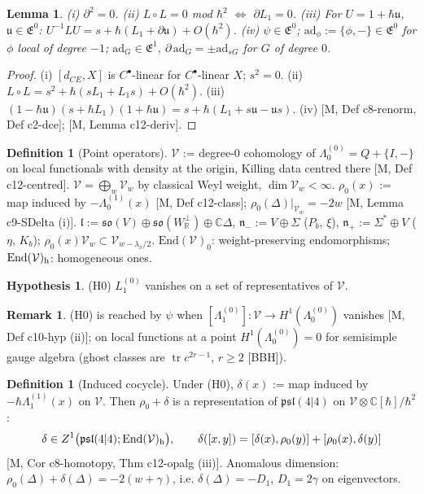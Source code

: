 \documentclass[10pt]{article}
\newtheorem{lemma}[theorem]{Lemma}
\theoremstyle{definition}
\newtheorem{definition}[theorem]{Definition}
\newtheorem{hypothesis}[theorem]{Hypothesis}
\newtheorem{remark}[theorem]{Remark}
\newcommand{\pl}{\mathfrak{psl}(4|4)}
\newcommand{\E}{\mathfrak E}
\newcommand{\V}{\mathcal V}
\newcommand{\ad}{\mathrm{ad}}
\newcommand{\End}{\mathrm{End}}
\newcommand{\Wp}{W_{\mathbb R}^\perp}
\newcommand{\lf}{\mathfrak l}
\begin{document}
\begin{lemma}\label{lem:def}
(i) $\partial^2=0$. (ii) $L\circ L=0$ mod $\hbar^2$ $\Leftrightarrow$ $\partial L_1=0$. (iii) For $U=1+\hbar\mathfrak u$, $\mathfrak u\in\E^0$: $U^{-1}LU=s+\hbar(L_1+\partial\mathfrak u)+O(\hbar^2)$. (iv) $\psi\in\E^0$; $\ad_\phi:=\{\phi,-\}\in\E^0$ for $\phi$ local of degree $-1$; $\ad_G\in\E^1$, $\partial\,\ad_G=\pm\ad_{sG}$ for $G$ of degree $0$.
\end{lemma}
\begin{proof}
(i) $[d_{CE},X]$ is $C^\bullet$-linear for $C^\bullet$-linear $X$; $s^2=0$. (ii) $L\circ L=s^2+\hbar(sL_1+L_1s)+O(\hbar^2)$. (iii) $(1-\hbar\mathfrak u)(s+\hbar L_1)(1+\hbar\mathfrak u)=s+\hbar(L_1+s\mathfrak u-\mathfrak us)$. (iv) [M, Def c8-renorm, Def c2-dce]; [M, Lemma c12-deriv].
\end{proof}

\begin{definition}[Point operators]\label{def:V}
$\V$ := degree-$0$ cohomology of $\Lambda_0^{(0)}=Q+\{I,-\}$ on local functionals with density at the origin, Killing data centred there [M, Def c12-centred]. $\V=\bigoplus_w\V_w$ by classical Weyl weight, $\dim\V_w<\infty$. $\rho_0(x)$ := map induced by $-\Lambda_0^{(1)}(x)$ [M, Def c12-class]; $\rho_0(\Delta)|_{\V_w}=-2w$ [M, Lemma c9-SDelta (i)]. $\lf:=\mathfrak{so}(V)\oplus\mathfrak{so}(\Wp)\oplus\mathbb C\Delta$, $\mathfrak n_-:=V\oplus\Sigma$ ($P_b$, $\xi$), $\mathfrak n_+:=\Sigma^*\oplus V$ ($\eta$, $K_b$); $\rho_0(x)\V_w\subset\V_{w-\lambda_x/2}$. $\End(\V)_0$: weight-preserving endomorphisms; $\End(\V)_{\rm h}$: homogeneous ones.
\end{definition}

\begin{hypothesis}\label{hyp:H0}
(H0) $L_1^{(0)}$ vanishes on a set of representatives of $\V$.
\end{hypothesis}

\begin{remark}
(H0) is reached by $\psi$ when $[\Lambda_1^{(0)}]:\V\to H^1(\Lambda_0^{(0)})$ vanishes [M, Def c10-hyp (ii)]; on local functions at a point $H^1(\Lambda_0^{(0)})=0$ for semisimple gauge algebra (ghost classes are $\operatorname{tr}c^{2r-1}$, $r\ge2$ [BBH]).
\end{remark}

\begin{definition}[Induced cocycle]\label{def:delta}
Under (H0), $\delta(x)$ := map induced by $-\hbar\Lambda_1^{(1)}(x)$ on $\V$. Then $\rho_0+\delta$ is a representation of $\pl$ on $\V\otimes\mathbb C[\hbar]/\hbar^2$:
\[
\delta\in Z^1\big(\pl;\End(\V)_{\rm h}\big),\qquad \delta([x,y])=[\delta(x),\rho_0(y)]+[\rho_0(x),\delta(y)]
\]
[M, Cor c8-homotopy, Thm c12-opalg (iii)]. Anomalous dimension: $\rho_0(\Delta)+\delta(\Delta)=-2(w+\gamma)$, i.e. $\delta(\Delta)=-D_1$, $D_1=2\gamma$ on eigenvectors.
\end{definition}
\end{document}
